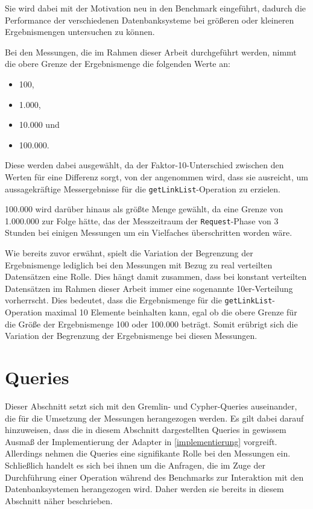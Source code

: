 Sie wird dabei mit der Motivation neu in den Benchmark eingeführt, dadurch die Performance der verschiedenen Datenbanksysteme bei größeren oder kleineren Ergebnismengen untersuchen zu können. 

Bei den Messungen, die im Rahmen dieser Arbeit durchgeführt werden, nimmt die obere Grenze der Ergebnismenge die folgenden Werte an:
\begin{itemize}
    \item 100,
    \item 1.000,
    \item 10.000 und
    \item 100.000. 
\end{itemize}
Diese werden dabei ausgewählt, da der Faktor-10-Unterschied zwischen den Werten für eine Differenz sorgt, von der angenommen wird, dass sie ausreicht, um aussagekräftige Messergebnisse für die \texttt{getLinkList}-Operation zu erzielen. 

100.000 wird darüber hinaus als größte Menge gewählt, da eine Grenze von 1.000.000 zur Folge hätte, das der Messzeitraum der \texttt{Request}-Phase von 3 Stunden bei einigen Messungen um ein Vielfaches überschritten worden wäre.

Wie bereits zuvor erwähnt, spielt die Variation der Begrenzung der Ergebnismenge lediglich bei den Messungen mit Bezug zu real verteilten Datensätzen eine Rolle. Dies hängt damit zusammen, dass bei konstant verteilten Datensätzen im Rahmen dieser Arbeit immer eine sogenannte 10er-Verteilung vorherrscht. Dies bedeutet, dass die Ergebnismenge für die \texttt{getLinkList}-Operation maximal 10 Elemente beinhalten kann, egal ob die obere Grenze für die Größe der Ergebnismenge 100 oder 100.000 beträgt. Somit erübrigt sich die Variation der Begrenzung der Ergebnismenge bei diesen Messungen. 

\section{Queries}
\label{analyse:queries}
Dieser Abschnitt setzt sich mit den Gremlin- und Cypher-Queries auseinander, die für die Umsetzung der Messungen herangezogen werden. Es gilt dabei darauf hinzuweisen, dass die in diesem Abschnitt dargestellten Queries in gewissem Ausmaß der Implementierung der Adapter in \autoref{implementierung} vorgreift. Allerdings nehmen die Queries eine signifikante Rolle bei den Messungen ein. Schließlich handelt es sich bei ihnen um die Anfragen, die im Zuge der Durchführung einer Operation während des Benchmarks zur Interaktion mit den Datenbanksystemen herangezogen wird. Daher werden sie bereits in diesem Abschnitt näher beschrieben.


